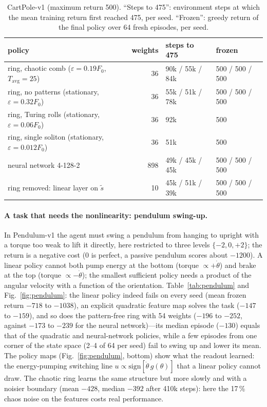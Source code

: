 \documentclass[10pt,a4paper]{article}
\newcommand{\ts}{\tilde s}
\newcommand{\Tavg}{T_{\mathrm{avg}}}
\newcommand{\Fz}{F_0}
\begin{document}
\begin{table}[h]
\centering\small
\caption{CartPole-v1 (maximum return 500).  ``Steps to 475'': environment steps at which the mean training return first
reached 475, per seed.  ``Frozen'': greedy return of the final policy over 64 fresh episodes, per seed.}
\label{tab:cartpole}
\begin{tabular}{lrll}
\toprule
policy & weights & steps to 475 & frozen \\
\midrule
ring, chaotic comb ($\varepsilon=0.19\Fz$, $\Tavg=25$) & 36 & 90k / 55k / 84k & 500 / 500 / 500 \\
ring, no patterns (stationary, $\varepsilon=0.32\Fz$) & 36 & 55k / 51k / 78k & 500 / 500 / 500 \\
ring, Turing rolls (stationary, $\varepsilon=0.06\Fz$) & 36 & 92k & 500 \\
ring, single soliton (stationary, $\varepsilon=0.012\Fz$) & 36 & 51k & 500 \\
neural network 4-128-2 & 898 & 49k / 45k / 45k & 500 / 500 / 500 \\
ring removed: linear layer on $\ts$ & 10 & 45k / 51k / 39k & 500 / 500 / 500 \\
\bottomrule
\end{tabular}
\end{table}

\paragraph{A task that needs the nonlinearity: pendulum swing-up.}  In Pendulum-v1 the agent must swing a pendulum from
hanging to upright with a torque too weak to lift it directly, here restricted to three levels $\{-2,0,+2\}$; the return
is a negative cost (0 is perfect, a passive pendulum scores about $-1200$).  A linear policy cannot both pump energy at the
bottom (torque $\propto+\dot\theta$) and brake at the top (torque $\propto-\dot\theta$); the smallest sufficient policy needs
a product of the angular velocity with a function of the orientation.  Table~\ref{tab:pendulum} and Fig.~\ref{fig:pendulum}:
the linear policy indeed fails on every seed (mean frozen return $-718$ to $-1038$), an explicit quadratic feature map
solves the task ($-147$ to $-159$), and so does the pattern-free ring with 54 weights ($-196$ to $-252$, against $-173$ to
$-239$ for the neural network)---its median episode ($-130$) equals that of the quadratic and neural-network policies, while a
few episodes from one corner of the state space (2--4 of 64 per seed) fail to swing up and lower its mean.  The policy maps (Fig.~\ref{fig:pendulum}, bottom) show what the readout
learned: the energy-pumping switching line $u\propto\mathrm{sign}[\dot\theta\, g(\theta)]$ that a linear policy cannot draw.  The
chaotic ring learns the same structure but more slowly and with a noisier boundary (mean $-428$, median $-392$ after 410k
steps): here the 17\,\% chaos noise on the features costs real performance.
\end{document}
